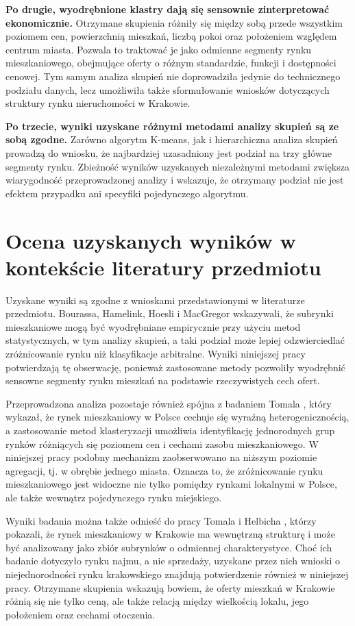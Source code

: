 \documentclass{report}
\begin{document}
\textbf{Po drugie, wyodrębnione klastry dają się sensownie zinterpretować ekonomicznie.} Otrzymane skupienia różniły się między sobą przede wszystkim poziomem cen, powierzchnią mieszkań, liczbą pokoi oraz położeniem względem centrum miasta. Pozwala to traktować je jako odmienne segmenty rynku mieszkaniowego, obejmujące oferty o różnym standardzie, funkcji i dostępności cenowej. Tym samym analiza skupień nie doprowadziła jedynie do technicznego podziału danych, lecz umożliwiła także sformułowanie wniosków dotyczących struktury rynku nieruchomości w Krakowie.

\textbf{Po trzecie, wyniki uzyskane różnymi metodami analizy skupień są ze sobą zgodne.} Zarówno algorytm K-means, jak i hierarchiczna analiza skupień prowadzą do wniosku, że najbardziej uzasadniony jest podział na trzy główne segmenty rynku. Zbieżność wyników uzyskanych niezależnymi metodami zwiększa wiarygodność przeprowadzonej analizy i wskazuje, że otrzymany podział nie jest efektem przypadku ani specyfiki pojedynczego algorytmu.

\section{Ocena uzyskanych wyników w kontekście literatury przedmiotu}

Uzyskane wyniki są zgodne z wnioskami przedstawionymi w literaturze przedmiotu. Bourassa, Hamelink, Hoesli i MacGregor \cite{bourassa1999} wskazywali, że subrynki mieszkaniowe mogą być wyodrębniane empirycznie przy użyciu metod statystycznych, w tym analizy skupień, a taki podział może lepiej odzwierciedlać zróżnicowanie rynku niż klasyfikacje arbitralne. Wyniki niniejszej pracy potwierdzają tę obserwację, ponieważ zastosowane metody pozwoliły wyodrębnić sensowne segmenty rynku mieszkań na podstawie rzeczywistych cech ofert.

Przeprowadzona analiza pozostaje również spójna z badaniem Tomala \cite{tomal2021}, który wykazał, że rynek mieszkaniowy w Polsce cechuje się wyraźną heterogenicznością, a zastosowanie metod klasteryzacji umożliwia identyfikację jednorodnych grup rynków różniących się poziomem cen i cechami zasobu mieszkaniowego. W niniejszej pracy podobny mechanizm zaobserwowano na niższym poziomie agregacji, tj. w obrębie jednego miasta. Oznacza to, że zróżnicowanie rynku mieszkaniowego jest widoczne nie tylko pomiędzy rynkami lokalnymi w Polsce, ale także wewnątrz pojedynczego rynku miejskiego.

Wyniki badania można także odnieść do pracy Tomala i Helbicha \cite{tomalhelbich2022}, którzy pokazali, że rynek mieszkaniowy w Krakowie ma wewnętrzną strukturę i może być analizowany jako zbiór subrynków o odmiennej charakterystyce. Choć ich badanie dotyczyło rynku najmu, a nie sprzedaży, uzyskane przez nich wnioski o niejednorodności rynku krakowskiego znajdują potwierdzenie również w niniejszej pracy. Otrzymane skupienia wskazują bowiem, że oferty mieszkań w Krakowie różnią się nie tylko ceną, ale także relacją między wielkością lokalu, jego położeniem oraz cechami otoczenia.
\end{document}
